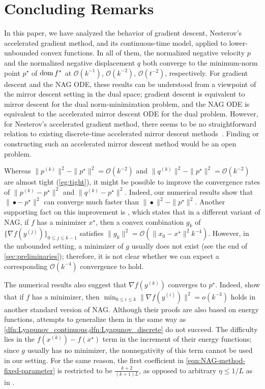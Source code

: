 \documentclass[11pt,a4paper]{article}
\theoremstyle{definition}
\theoremstyle{plain}
\newcommand{\dom}{\mathop{\rm dom}}
\begin{document}
\section{Concluding Remarks}\label{sec:conclusion}
In this paper, we have analyzed the behavior of gradient descent, Nesterov's accelerated gradient method, and its continuous-time model, applied to lower-unbounded convex functions.
In all of them, the normalized negative velocity $p$ and the normalized negative displacement $q$ both converge to the minimum-norm point $p^\star$ of $\dom f^\ast$ at $\mathcal{O}(k^{-1})$, $\mathcal{O}(k^{-2})$, $\mathcal{O}(t^{-2})$, respectively.
For gradient descent and the NAG ODE, these results can be understood from a viewpoint of the mirror descent setting in the dual space; gradient descent is equivalent to mirror descent for the dual norm-minimization problem, and the NAG ODE is equivalent to the accelerated mirror descent ODE for the dual problem.
However, for Nesterov's accelerated gradient method, there seems to be no straightforward relation to existing discrete-time accelerated mirror descent methods~\cite{DO2018,DSZ2024,KBB2015,Nesterov2005}.
Finding or constructing such an accelerated mirror descent method would be an open problem.

Whereas $\|p^{(k)}\|^2 - \|p^\star\|^2 = \mathcal{O}(k^{-2})$ and $\|q^{(k)}\|^2 - \|p^\star\|^2 = \mathcal{O}(k^{-2})$ are almost tight (\cref{eg:tight}), it might be possible to improve the convergence rates of $\|p^{(k)} - p^\star\|^2$ and $\|q^{(k)} - p^\star\|^2$.
Indeed, our numerical results show that $\|\bullet -~p^\star\|^2$ can converge much faster than $\|\bullet\|^2 - \|p^\star\|^2$.
Another supporting fact on this improvement is \cite[Theorem~2.2.4]{Nesterov2018}, which states that in a different variant of NAG, if $f$ has a minimizer $x^\star$, then a convex combination $g_k$ of $\{\nabla f(y^{(j)})\}_{0 \le j \le k - 1}$ satisfies $\|g_k\|^2 = \mathcal{O}(\|x_ 0 -x^\star\|^2k^{-4})$.
However, in the unbounded setting, a minimizer of $g$ usually does not exist (see the end of \cref{sec:preliminaries}); therefore, it is not clear whether we can expect a corresponding $\mathcal{O}(k^{-4})$ convergence to hold.

The numerical results also suggest that $\nabla f(y^{(k)})$ converges to $p^\star$.
Indeed, \cite{CSY2022,SDJS2022} show that if $f$ has a minimizer, then $\min_{0 \le i \le k}\|\nabla f(y^{(i)})\|^2 = o(k^{-3})$ holds in another standard version of NAG.
Although their proofs are also based on energy functions, attempts to generalize them in the same way as \cref{dfn:Lyapunov_continuous,dfn:Lyapunov_discrete} do not succeed.
The difficulty lies in the $f(x^{(k)}) - f(x^\star)$ term in the increment of their energy functions; since $g$ usually has no minimizer, the nonnegativity of this term cannot be used in our setting.
For the same reason, the first coefficient in \eqref{eqn:NAG-method-fixed-parameter} is restricted to be $\frac{k + 2}{(k + 1)L}$, as opposed to arbitrary $\eta \le 1/L$ as in \cite{CSY2022,SDJS2022,SBC2016}.
\end{document}
